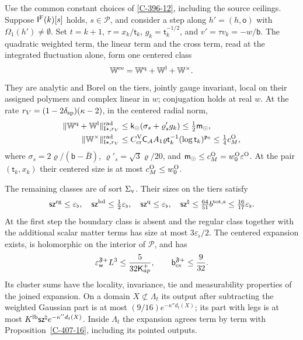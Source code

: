 \documentclass[11pt,letterpaper,reqno]{amsart}
\makeatletter
\theoremstyle{definition}
\newcommand{\ms@minorstart}{%
  \pushQED{\qed}\renewcommand{\qedsymbol}{$\blacksquare$}}
\newenvironment{lemma}[1][]{\ms@minorstart\ms@lemma[#1]}
  {\popQED\endms@lemma}
\theoremstyle{remark}
\makeatother
\begin{document}
\begin{lemma}[The centered frame at a source]\label{C-407-38}
Use the common constant choices of \cref{C-396-12}, including
the source ceilings. Suppose
$\mathsf I^{\rm F}(k)[s]$ holds, $s\in\mathcal P$, and consider a
step along $h'=(h,\mathsf o)$ with $\Omega_1(h')\ne\emptyset$.
Set $t=k+1$, $\tau=x_k/\mathsf t_k$, $g_k=\mathsf t_k^{-1/2}$,
and $v'=\tau v_k=-w/\mathsf b$. The quadratic weighted term,
the linear term and the cross term, read at the integrated
fluctuation alone, form one centered class
\[
 \mathbb W^{\rm ce}=\mathbb W^{\rm q}
                         +\mathbb W^{\rm l}+\mathbb W^\times.
\]
They are analytic and Borel on the tiers, jointly gauge invariant,
local on their assigned polymers and complex linear in $w$;
conjugation holds at real $w$. At the rate
$r_V=(1-2\delta_{\rm sp})(\kappa-2)$, in the centered radial norm,
\[
\begin{split}
 \|\mathbb W^{\rm q}+\mathbb W^{\rm l}\|^{\rm rad}_{{\rm I}\star,r_V}
 &\le\mathsf k_\odot(\sigma_s+\varrho'_sg_k)
                         \le\tfrac12\mathsf m_\odot,\\
 \|\mathbb W^\times\|^{\rm rad}_{{\rm I}\star,r_V}
 &\le C_{\rm cr}^{\rm V}\mathsf C_{\mathcal A}A_1\varrho
           \mathsf t_k^{-1}(\log\mathsf t_k)^{\mathfrak p_0}
                         \le\tfrac14c_M^{\rm O},
\end{split}
\]
where $\sigma_s=2\varrho/(\mathsf b-\bar B)$,
$\varrho'_s=\sqrt3\varrho/20$, and
$\mathsf m_\odot\le c_M^{\rm O}=w_0^{\rm O}\varepsilon^{\rm O}$.
At the pair $(\mathsf t_k,x_k)$ their centered size is at most
$c_M^{\rm O}\le w_0^{\rm O}$.

The remaining classes are of sort $\Sigma_{\rm v}$. Their sizes
on the tiers satisfy
\[
 \mathsf{sz}^{\rm rg}\le\varepsilon_\flat,\quad
 \mathsf{sz}^{\rm bd}\le\tfrac12\varepsilon_\flat,\quad
 \mathsf{sz}^{\rm q}\le\varepsilon_\flat,\quad
 \mathsf{sz}^\natural\le\tfrac{64}{51}b^{\rm tot,s}
                         \le\tfrac{16}{17}\varepsilon_\flat.
\]
At the first step the boundary class is absent and the regular
class together with the additional scalar matter terms has size
at most $3\varepsilon_\flat/2$. The centered expansion exists,
is holomorphic on the interior of $\mathcal P$, and has
\[
 \varepsilon_{\mathsf w}^{\mathfrak F+}L^3
       \le\frac5{32\mathsf K_{
       ap}^+},\qquad
 \mathsf b_{\rm cs}^{\mathfrak F+}\le\frac9{32}.
\]
Its cluster sums have the locality, invariance, tie and
measurability properties of the joined expansion. On a domain
$X\not\subset\Lambda_t$ its output after subtracting the
weighted Gaussian part is at most
$(9/16)e^{-\kappa''d_t(X)}$; its part with legs is at most
$K^{\rm lb}\mathsf{sz}^\natural e^{-\kappa''d_t(X)}$.
Inside $\Lambda_t$ the expansion agrees term by term with
Proposition~\ref{C-407-16}, including its pointed outputs.
\end{lemma}
\end{document}
